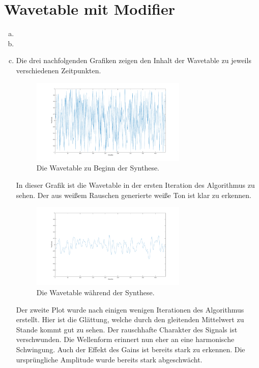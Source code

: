 \chapter{Wavetable mit Modifier}


\begin{enumerate}[a)]
\item

\item

\item
Die drei nachfolgenden Grafiken zeigen den Inhalt der Wavetable zu jeweils verschiedenen Zeitpunkten.

\begin{figure}[H]
    \center
    \includegraphics[width = 0.7\textwidth]{Figures/Anfang.pdf}
    \caption{Die Wavetable zu Beginn der Synthese.}
    \label{fig:bs1}
\end{figure}

In dieser Grafik ist die Wavetable in der ersten Iteration des Algorithmus zu sehen. 
Der aus weißem Rauschen generierte weiße Ton ist klar zu erkennen. 

\begin{figure}[H]
    \center
    \includegraphics[width = 0.7\textwidth]{Figures/Mitte.pdf}
    \caption{Die Wavetable während der Synthese.}
    \label{fig:bs1}
\end{figure}

Der zweite Plot wurde nach einigen wenigen Iterationen des Algorithmus erstellt.
Hier ist die Glättung, welche durch den gleitenden Mittelwert zu Stande kommt gut zu sehen.
Der rauschhafte Charakter des Signals ist verschwunden.
Die Wellenform erinnert nun eher an eine harmonische Schwingung.
Auch der Effekt des Gains ist bereits stark zu erkennen.
Die ursprüngliche Amplitude wurde bereits stark abgeschwächt.


\end{enumerate}
